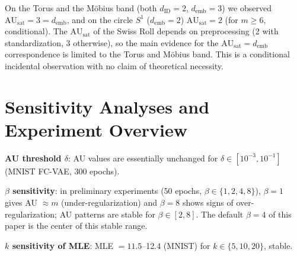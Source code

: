 \documentclass[make,article,submit,pdftex,moreauthors]{Definitions/mdpi}
\newcommand{\dID}{d_{\mathrm{ID}}}
\newcommand{\AUsat}{\mathrm{AU}_{\mathrm{sat}}}
\newcommand{\demb}{d_{\mathrm{emb}}}
\begin{document}
On the Torus and the M\"obius band (both $\dID = 2$, $\demb = 3$) we
observed $\AUsat = 3 = \demb$, and on the circle $S^1$ ($\demb = 2$)
$\AUsat = 2$ (for $m \geq 6$, conditional).
The $\AUsat$ of the Swiss Roll depends on preprocessing (2 with
standardization, 3 otherwise), so the main evidence for the
$\AUsat = \demb$ correspondence is limited to the Torus and M\"obius band.
This is a conditional incidental observation with no claim of theoretical
necessity.

\section[\appendixname~\thesection]{Sensitivity Analyses and Experiment Overview}\label{app:sens}

\textbf{AU threshold $\delta$}: AU values are essentially unchanged for
$\delta \in [10^{-3}, 10^{-1}]$ (MNIST FC-VAE, 300 epochs).

\textbf{$\beta$ sensitivity}: in preliminary experiments (50 epochs,
$\beta \in \{1, 2, 4, 8\}$), $\beta = 1$ gives AU $\approx m$
(under-regularization) and $\beta = 8$ shows signs of over-regularization;
AU patterns are stable for $\beta \in [2, 8]$.
The default $\beta = 4$ of this paper is the center of this stable range.

\textbf{$k$ sensitivity of MLE}: MLE $= 11.5$--12.4 (MNIST) for
$k \in \{5, 10, 20\}$, stable.
\end{document}
